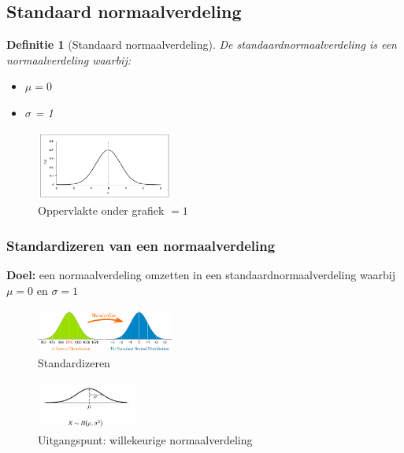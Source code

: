 \documentclass{article}
\newtheorem{theorem}{Definitie}[section]
\begin{document}
\subsection{Standaard normaalverdeling}

\begin{theorem}[Standaard normaalverdeling]
    De standaardnormaalverdeling is een normaalverdeling waarbij:
    
    \begin{itemize}
        \item $\mu = 0$
        \item $\sigma$ = 1
    \end{itemize}
\end{theorem}


\begin{figure}[H]
    \centering
    \includegraphics[width=0.4\textwidth]{standaardnormaalverdeling.png}
    \caption{Oppervlakte onder grafiek $=1$}
\end{figure}

\subsubsection{Standardizeren van een normaalverdeling}

\textbf{Doel:} een normaalverdeling omzetten in een standaardnormaalverdeling waarbij $\mu = 0$ en $\sigma = 1$

\begin{figure}[H]
    \centering
    \includegraphics[width=0.4\textwidth]{standardizeren.png}
    \caption{Standardizeren}
\end{figure}

\begin{figure}[H]
    \centering
    \includegraphics[width=0.3\textwidth]{gauss-notatiewijze.png}
    \caption{Uitgangspunt: willekeurige normaalverdeling}
\end{figure}
\end{document}
